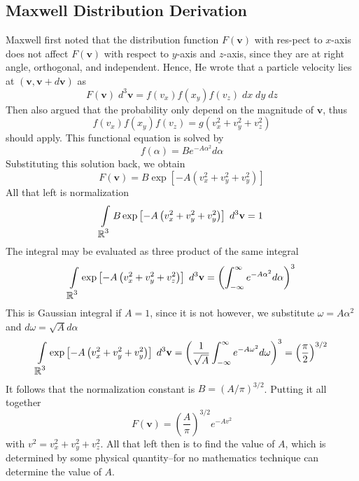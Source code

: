 \documentclass[../../../Main.tex]{subfiles}
\begin{document}
\subsection*{Maxwell Distribution Derivation}
Maxwell first noted that the distribution function $F(\mathbf{v})$ with res-pect to $x$-axis does not affect $F(\mathbf{v})$ with respect to $y$-axis and $z$-axis, since they are at right angle, orthogonal, and independent. Hence, He wrote that a particle velocity lies at $(\mathbf{v}, \mathbf{v}+d\mathbf{v})$ as 
\begin{equation*}
    F(\mathbf{v})\;d^3\mathbf{v}=f(v_x)f(x_y)f(v_z)\;dx\;dy\;dz
\end{equation*}
Then also argued that the probability only depend on the magnitude of $\mathbf{v}$, thus
\begin{equation*}
    f(v_x)f(x_y)f(v_z)= g(v_x^2+v_y^2+v_z^2)
\end{equation*}
should apply. This functional equation is solved by
\begin{equation*}
    f(\alpha)=Be^{-A\alpha^2}d\alpha
\end{equation*}
Substituting this solution back, we obtain 
\begin{equation*}
    F(\mathbf{v})=B \exp \left[-A\left(v_x^2+v_y^2+v_y^2\right)\right]
\end{equation*}
All that left is normalization
\begin{equation*}
    \int\displaylimits_{\displaystyle\mathbb{R}^3} B \exp \left[-A\left(v_x^2+v_y^2+v_y^2\right)\right]\; d^3\mathbf{v}=1
\end{equation*}
The integral may be evaluated as three product of the same integral
\begin{equation*}
    \int\displaylimits_{\displaystyle\mathbb{R}^3} \exp \left[-A\left(v_x^2+v_y^2+v_z^2\right)\right]\; d^3\mathbf{v} = \left(\int_{-\infty}^{\infty}e^{-A\alpha^2}d\alpha \right)^3
\end{equation*}
This is Gaussian integral if $A=1$, since it is not however, we substitute $\omega=A\alpha^2$ and $d\omega=\sqrt{A}d\alpha$
\begin{equation*}
    \int\displaylimits_{\displaystyle\mathbb{R}^3} \exp \left[-A\left(v_x^2+v_y^2+v_y^2\right)\right]\; d^3\mathbf{v} = \left(\frac{1}{\sqrt{A}}\int_{-\infty}^{\infty}e^{-A\omega^2}d\omega\right)^3=\left(\frac{\pi}{2}\right)^{3/2}
\end{equation*}
It follows that the normalization constant is $B=(A/\pi)^{3/2}$. Putting it all together
\begin{equation*}
    F(\mathbf{v})= \left(\frac{A}{\pi}\right)^{3/2}e^{-Av^2}
\end{equation*}
with $v^2=v_x^2+v_y^2+v_z^2$. All that left then is to find the value of $A$, which is determined by some physical quantity--for no mathematics technique can determine the value of $A$.
\end{document}
